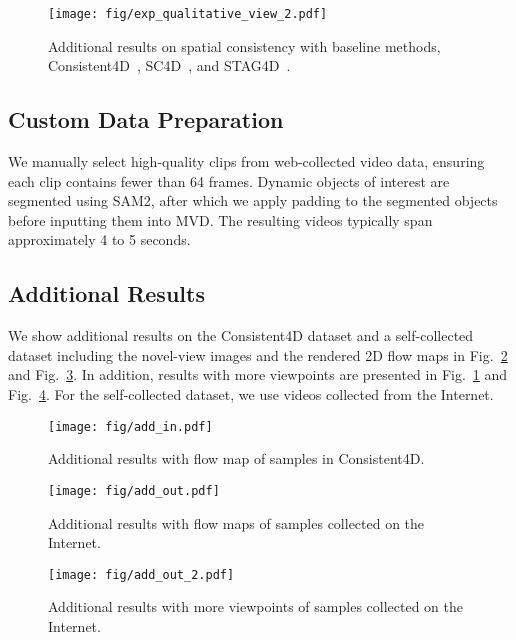 \begin{figure}[b]
    \centering
    \texttt{[image: fig/exp\_qualitative\_view\_2.pdf]}
    \caption{Additional results on spatial consistency with baseline methods, Consistent4D~\citep{jiang2023consistent4d}, SC4D~\citep{wu2024sc4d}, and STAG4D~\citep{zeng2024stag4d}.}
    \label{fig:compare_view2}
\end{figure}

\subsection{Custom Data Preparation}

We manually select high-quality clips from web-collected video data, ensuring each clip contains fewer than 64 frames. Dynamic objects of interest are segmented using SAM2, after which we apply padding to the segmented objects before inputting them into MVD. The resulting videos typically span approximately 4 to 5 seconds.

\subsection{Additional Results}
\label{sec:addtional-results}
We show additional results on the Consistent4D dataset and a self-collected dataset including the novel-view images and the rendered 2D flow maps in Fig.~\ref{fig:add_in} and Fig.~\ref{fig:add_out_1}. In addition, results with more viewpoints are presented in Fig.~\ref{fig:compare_view2} and Fig.~\ref{fig:add_out_2}. For the self-collected dataset, we use videos collected from the Internet. 





\begin{figure}[t]
    \centering
    \texttt{[image: fig/add\_in.pdf]}
    \caption{Additional results with flow map of samples in Consistent4D.}
    \label{fig:add_in}
\end{figure}

\begin{figure}[t]
    \centering
    \texttt{[image: fig/add\_out.pdf]}
    \caption{Additional results with flow maps of samples collected on the Internet.}
    \label{fig:add_out_1}
\end{figure}

\begin{figure}[htbp!]
    \centering
    \texttt{[image: fig/add\_out\_2.pdf]}
    \caption{Additional results with more viewpoints of samples collected on the Internet.}
    \label{fig:add_out_2}
\end{figure}

